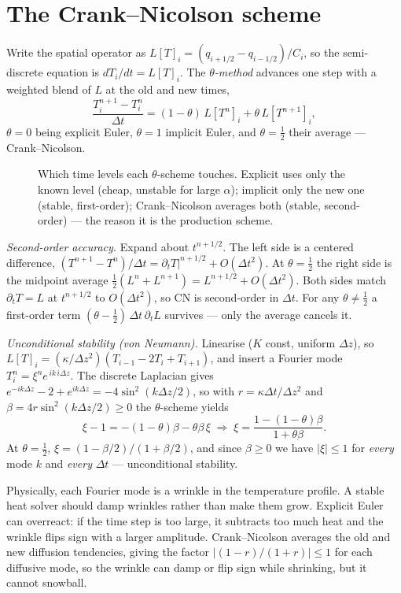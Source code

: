 \documentclass[11pt]{report}
\begin{document}
\section{The Crank--Nicolson scheme}\label{app:cn}
Write the spatial operator as $L[T]_i = (q_{i+1/2}-q_{i-1/2})/C_i$, so the
semi-discrete equation is $dT_i/dt=L[T]_i$. The \emph{$\theta$-method} advances
one step with a weighted blend of $L$ at the old and new times,
\[
\frac{T_i^{n+1}-T_i^{n}}{\Delta t}
= (1-\theta)\,L[T^{n}]_i + \theta\,L[T^{n+1}]_i,
\]
$\theta=0$ being explicit Euler, $\theta=1$ implicit Euler, and
$\theta=\tfrac12$ their average --- Crank--Nicolson.

\begin{figure}[htbp]\centering

\caption{Which time levels each $\theta$-scheme touches. Explicit uses
only the known level (cheap, unstable for large $\alpha$); implicit only
the new one (stable, first-order); Crank--Nicolson averages both (stable,
second-order) --- the reason it is the production scheme.}
\label{fig:thetastencil}
\end{figure}

\emph{Second-order accuracy.} Expand about $t^{n+1/2}$. The left side is a centered
difference, $(T^{n+1}-T^n)/\Delta t=\partial_t T|^{n+1/2}+O(\Delta t^2)$. At
$\theta=\tfrac12$ the right side is the midpoint average
$\tfrac12(L^n+L^{n+1})=L^{n+1/2}+O(\Delta t^2)$. Both sides match
$\partial_t T=L$ at $t^{n+1/2}$ to $O(\Delta t^2)$, so CN is second-order in
$\Delta t$. For any $\theta\neq\tfrac12$ a first-order term
$(\theta-\tfrac12)\,\Delta t\,\partial_t L$ survives --- only the average cancels it.

\emph{Unconditional stability (von Neumann).} Linearise ($K$ const, uniform
$\Delta z$), so $L[T]_i=(\kappa/\Delta z^2)(T_{i-1}-2T_i+T_{i+1})$, and insert a
Fourier mode $T_i^n=\xi^n e^{\,ik\,i\Delta z}$. The discrete Laplacian gives
$e^{-ik\Delta z}-2+e^{ik\Delta z}=-4\sin^2(k\Delta z/2)$, so with $r=\kappa\Delta
t/\Delta z^2$ and $\beta=4r\sin^2(k\Delta z/2)\ge0$ the $\theta$-scheme yields
\[
\xi-1=-(1-\theta)\beta-\theta\beta\,\xi
\;\Rightarrow\;
\xi=\frac{1-(1-\theta)\beta}{1+\theta\beta}.
\]
At $\theta=\tfrac12$, $\xi=(1-\beta/2)/(1+\beta/2)$, and since $\beta\ge0$ we have
$|\xi|\le1$ for \emph{every} mode $k$ and \emph{every} $\Delta t$ --- unconditional
stability.

\begin{plain}
Physically, each Fourier mode is a wrinkle in the temperature profile. A stable
heat solver should damp wrinkles rather than make them grow. Explicit Euler can
overreact: if the time step is too large, it subtracts too much heat and the
wrinkle flips sign with a larger amplitude. Crank--Nicolson averages the old and
new diffusion tendencies, giving the factor $|(1-r)/(1+r)|\le1$ for each
diffusive mode, so the wrinkle can damp or flip sign while shrinking, but it
cannot snowball.
\end{plain}
\end{document}
